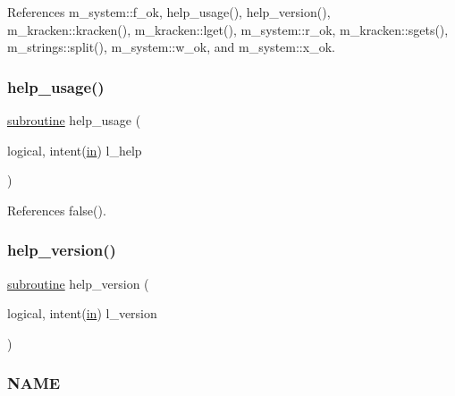 References m\+\_\+system\+::f\+\_\+ok, help\+\_\+usage(), help\+\_\+version(), m\+\_\+kracken\+::kracken(), m\+\_\+kracken\+::lget(), m\+\_\+system\+::r\+\_\+ok, m\+\_\+kracken\+::sgets(), m\+\_\+strings\+::split(), m\+\_\+system\+::w\+\_\+ok, and m\+\_\+system\+::x\+\_\+ok.

\mbox{\label{__which_8f90_a3e09a3b52ee8fb04eeb93fe5761626a8}} 
\subsubsection{\texorpdfstring{help\+\_\+usage()}{help\_usage()}}
{\footnotesize\ttfamily \hyperlink{M__stopwatch_83_8txt_acfbcff50169d691ff02d4a123ed70482}{subroutine} help\+\_\+usage (\begin{DoxyParamCaption}\item[{logical, intent(\hyperlink{M__journal_83_8txt_afce72651d1eed785a2132bee863b2f38}{in})}]{l\+\_\+help }\end{DoxyParamCaption})}



References false().

\mbox{\label{__which_8f90_a39c21619b08a3c22f19e2306efd7f766}} 
\subsubsection{\texorpdfstring{help\+\_\+version()}{help\_version()}}
{\footnotesize\ttfamily \hyperlink{M__stopwatch_83_8txt_acfbcff50169d691ff02d4a123ed70482}{subroutine} help\+\_\+version (\begin{DoxyParamCaption}\item[{logical, intent(\hyperlink{M__journal_83_8txt_afce72651d1eed785a2132bee863b2f38}{in})}]{l\+\_\+version }\end{DoxyParamCaption})}



\subsubsection*{N\+A\+ME}

